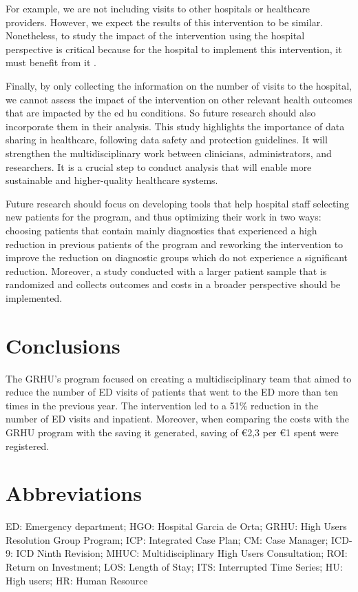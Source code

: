 \documentclass{bmcart}
\begin{document}
For example, we are not including visits to other hospitals or healthcare providers. 
However, we expect the results of this intervention to be similar.
Nonetheless, to study the impact of the intervention using the hospital perspective is critical because for the hospital to implement this intervention, it must benefit from it \cite{shumway_cost-effectiveness_2008}.
\par Finally, by only collecting the information on the number of visits to the hospital, we cannot assess the impact of the intervention on other relevant health outcomes that are impacted by the \gls{ed} \gls{hu} conditions. So future research should also incorporate them in their analysis. 
This study highlights the importance of data sharing in healthcare, following data safety and protection guidelines. It will strengthen the multidisciplinary work between clinicians, administrators, and researchers. It is a crucial step to conduct analysis that will enable more sustainable and higher-quality healthcare systems. 
\par Future research should focus on developing tools that help hospital staff selecting new patients for the program, and thus optimizing their work in two ways: choosing patients that contain mainly diagnostics that experienced a high reduction in previous patients of the program and reworking the intervention to improve the reduction on diagnostic groups which do not experience a significant reduction. Moreover, a study conducted with a larger patient sample that is randomized and collects outcomes and costs in a broader perspective should be implemented. 
\section*{Conclusions}
The GRHU's program focused on creating a multidisciplinary team that aimed to reduce the number of ED visits of patients that went to the ED more than ten times in the previous year. The intervention led to a 51\% reduction in the number of ED visits and inpatient. Moreover, when comparing the costs with the GRHU program with the saving it generated, saving of €2,3 per €1 spent were registered. 

\section*{Abbreviations}%
ED: Emergency department; HGO: Hospital Garcia de Orta; GRHU: High Users Resolution Group Program; ICP: Integrated Case Plan; CM: Case Manager; ICD-9: ICD Ninth Revision; MHUC: Multidisciplinary High Users Consultation; ROI: Return on Investment; LOS: Length of Stay; ITS: Interrupted Time Series; HU: High users; HR: Human Resource
\end{document}
